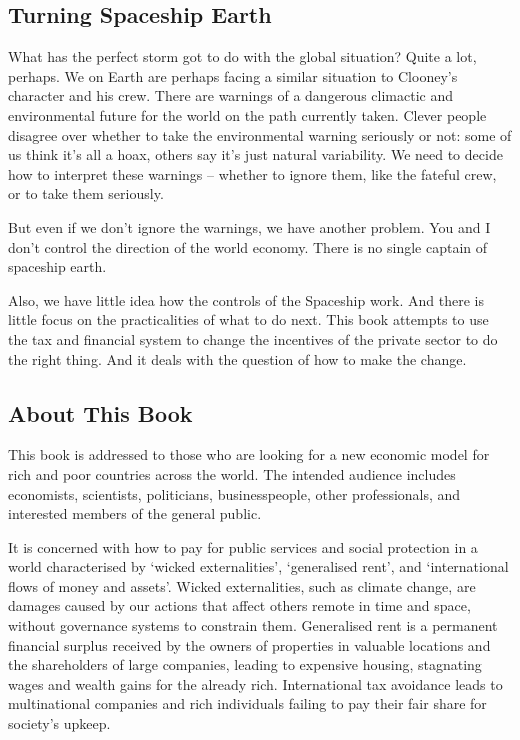 \documentclass[]{tufte-handout}
\begin{document}
\hypertarget{turning-spaceship-earth}{%
\subsection{Turning Spaceship Earth}\label{turning-spaceship-earth}}

What has the perfect storm got to do with the global situation? Quite a
lot, perhaps. We on Earth are perhaps facing a similar situation to
Clooney's character and his crew. There are warnings of a dangerous
climactic and environmental future for the world on the path currently
taken. Clever people disagree over whether to take the environmental
warning seriously or not: some of us think it's all a hoax, others say
it's just natural variability. We need to decide how to interpret these
warnings -- whether to ignore them, like the fateful crew, or to take
them seriously.

But even if we don't ignore the warnings, we have another problem. You
and I don't control the direction of the world economy. There is no
single captain of spaceship earth.

Also, we have little idea how the controls of the Spaceship work. And
there is little focus on the practicalities of what to do next. This
book attempts to use the tax and financial system to change the
incentives of the private sector to do the right thing. And it deals
with the question of how to make the change.

\hypertarget{about-this-book}{%
\subsection{About This Book}\label{about-this-book}}

This book is addressed to those who are looking for a new economic model
for rich and poor countries across the world. The intended audience
includes economists, scientists, politicians, businesspeople, other
professionals, and interested members of the general public.

It is concerned with how to pay for public services and social
protection in a world characterised by `wicked externalities',
`generalised rent', and `international flows of money and assets'.
Wicked externalities, such as climate change, are damages caused by our
actions that affect others remote in time and space, without governance
systems to constrain them. Generalised rent is a permanent financial
surplus received by the owners of properties in valuable locations and
the shareholders of large companies, leading to expensive housing,
stagnating wages and wealth gains for the already rich. International
tax avoidance leads to multinational companies and rich individuals
failing to pay their fair share for society's upkeep.
\end{document}
